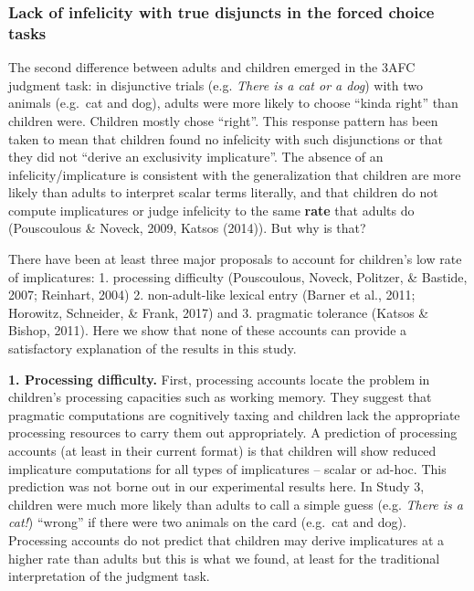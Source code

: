 \documentclass[floatsintext,man]{apa6}
\theoremstyle{definition}
\theoremstyle{definition}
\theoremstyle{definition}
\theoremstyle{remark}
\begin{document}
\subsubsection{Lack of infelicity with true disjuncts in the forced
choice
tasks}\label{lack-of-infelicity-with-true-disjuncts-in-the-forced-choice-tasks}

The second difference between adults and children emerged in the 3AFC
judgment task: in disjunctive trials (e.g. \emph{There is a cat or a
dog}) with two animals (e.g.~cat and dog), adults were more likely to
choose \enquote{kinda right} than children were. Children mostly chose
\enquote{right}. This response pattern has been taken to mean that
children found no infelicity with such disjunctions or that they did not
\enquote{derive an exclusivity implicature}. The absence of an
infelicity/implicature is consistent with the generalization that
children are more likely than adults to interpret scalar terms
literally, and that children do not compute implicatures or judge
infelicity to the same \textbf{rate} that adults do (Pouscoulous \&
Noveck, 2009, Katsos (2014)). But why is that?

There have been at least three major proposals to account for children's
low rate of implicatures: 1. processing difficulty (Pouscoulous, Noveck,
Politzer, \& Bastide, 2007; Reinhart, 2004) 2. non-adult-like lexical
entry (Barner et al., 2011; Horowitz, Schneider, \& Frank, 2017) and 3.
pragmatic tolerance (Katsos \& Bishop, 2011). Here we show that none of
these accounts can provide a satisfactory explanation of the results in
this study.

\textbf{1. Processing difficulty.} First, processing accounts locate the
problem in children's processing capacities such as working memory. They
suggest that pragmatic computations are cognitively taxing and children
lack the appropriate processing resources to carry them out
appropriately. A prediction of processing accounts (at least in their
current format) is that children will show reduced implicature
computations for all types of implicatures -- scalar or ad-hoc. This
prediction was not borne out in our experimental results here. In Study
3, children were much more likely than adults to call a simple guess
(e.g. \emph{There is a cat!}) \enquote{wrong} if there were two animals
on the card (e.g.~cat and dog). Processing accounts do not predict that
children may derive implicatures at a higher rate than adults but this
is what we found, at least for the traditional interpretation of the
judgment task.
\end{document}
